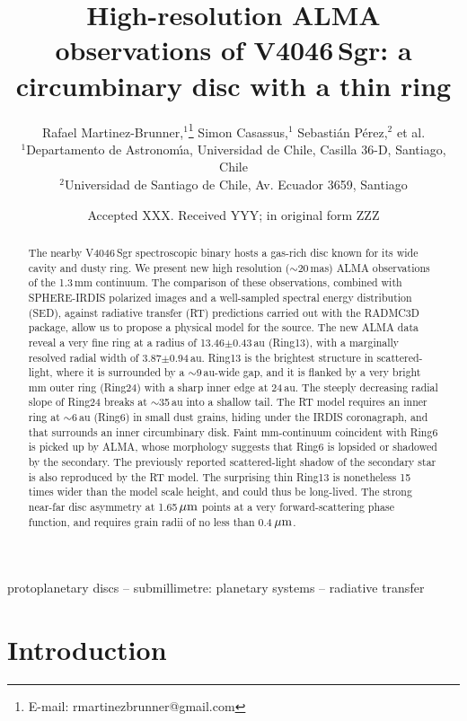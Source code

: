 \documentclass[letters,usenatbib,times]{mnras}
\title[High-resolution ALMA observations of V4046\,Sgr]{High-resolution ALMA observations of V4046\,Sgr: a circumbinary disc with a thin ring}
\author[R. Martinez Brunner et al.]{
Rafael Martinez-Brunner,$^{1}$\thanks{E-mail: rmartinezbrunner@gmail.com}
Simon Casassus,$^{1}$
Sebasti\'an P\'erez,$^{2}$
et al. 
\\
$^{1}$Departamento de Astronom\'{\i}a, Universidad de Chile, Casilla 36-D, Santiago, Chile\\
$^{2}$Universidad de Santiago de Chile, Av. Ecuador 3659, Santiago\\
}
\date{Accepted XXX. Received YYY; in original form ZZZ}
\begin{document}
\label{firstpage}
\pagerange{\pageref{firstpage}--\pageref{lastpage}}
\maketitle

\begin{abstract}
  The nearby V4046\,Sgr spectroscopic binary hosts a gas-rich disc known for its wide cavity and dusty ring. We present new high resolution ($\sim$20\,mas) ALMA observations of the 1.3\,mm continuum. The comparison of these observations, combined with SPHERE-IRDIS polarized images and a well-sampled spectral energy distribution (SED), against radiative transfer (RT) predictions carried out with the RADMC3D package, allow us to propose a physical model for the source. The new ALMA data reveal a very fine ring at a radius of 13.46$\pm$0.43\,au (Ring13), with a marginally resolved radial width of 3.87$\pm$0.94\,au. Ring13 is the brightest structure in scattered-light, where it is surrounded by a $\sim$9\,au-wide gap, and it is flanked by a very bright mm outer ring (Ring24) with a sharp inner edge at 24\,au. The steeply decreasing radial slope of Ring24 breaks at $\sim$35\,au into a shallow tail. The RT model requires an inner ring at $\sim$6\,au (Ring6) in small dust grains, hiding under the IRDIS coronagraph, and that surrounds an inner circumbinary disk. Faint mm-continuum coincident with Ring6 is picked up by ALMA, whose morphology suggests that Ring6 is lopsided or shadowed by the secondary. The previously reported scattered-light shadow of the secondary star is also reproduced by the RT model. The surprising thin Ring13 is nonetheless 15 times wider than the model scale height, and could thus be long-lived. The strong near-far disc asymmetry at 1.65\,$\hbox{$\mu$m}$ points at a very forward-scattering phase function, and requires grain radii of no less than 0.4\,$\hbox{$\mu$m}$. 
\end{abstract}

\begin{keywords}
 protoplanetary discs -- submillimetre: planetary systems -- radiative transfer
\end{keywords}



\section{Introduction} \label{sec:Introduction}
\end{document}
